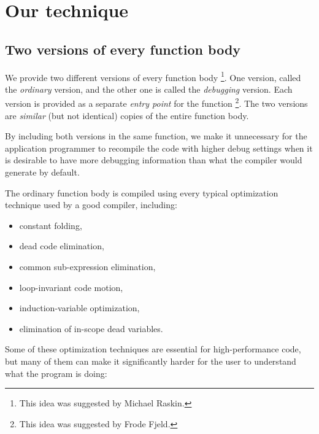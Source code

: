 \section{Our technique}
\label{sec-our-technique}

\subsection{Two versions of every function body}
\label{sec-two-body-versions}

We provide two different versions of every function body%
\footnote{This idea was suggested by Michael Raskin.}.
One version, called the \emph{ordinary} version, and the other one is
called the \emph{debugging} version.  Each version is provided as a
separate \emph{entry point} for the function%
\footnote{This idea was suggested by Frode Fjeld.}.
The two versions are \emph{similar} (but not
identical) copies of the entire function body.

By including both versions in the same function, we make it
unnecessary for the application programmer to recompile the code with
higher debug settings when it is desirable to have more debugging
information than what the compiler would generate by default.

The ordinary function body is compiled using every typical optimization
technique used by a good compiler, including:

\begin{itemize}
\item constant folding,
\item dead code elimination,
\item common sub-expression elimination,
\item loop-invariant code motion,
\item induction-variable optimization, 
\item elimination of in-scope dead variables.
\end{itemize}

Some of these optimization techniques are essential for
high-performance code, but many of them can make it significantly
harder for the user to understand what the program is doing:


